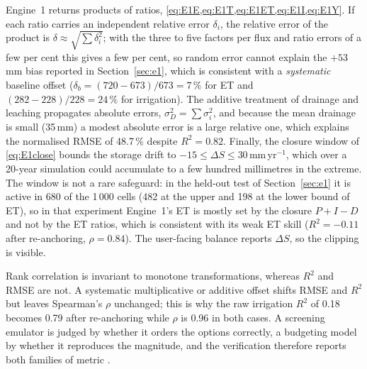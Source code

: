 Engine~1 returns products of ratios, \cref{eq:E1E,eq:E1T,eq:E1ET,eq:E1I,eq:E1Y}. If each ratio carries an independent relative error $\delta_i$, the relative error of the product is $\delta\approx\sqrt{\sum\delta_i^2}$; with the three to five factors per flux and ratio errors of a few per cent this gives a few per cent, so random error cannot explain the $+53$\,mm bias reported in Section~\ref{sec:e1}, which is consistent with a \emph{systematic} baseline offset ($\delta_b=(720-673)/673=7\,\%$ for ET and $(282-228)/228=24\,\%$ for irrigation). The additive treatment of drainage and leaching propagates absolute errors, $\sigma_D^2=\sum\sigma_i^2$, and because the mean drainage is small (35\,mm) a modest absolute error is a large relative one, which explains the normalised RMSE of 48.7\,\% despite $R^2=0.82$. Finally, the closure window of \cref{eq:E1close} bounds the storage drift to $-15\le\Delta S\le30$\,mm\,yr$^{-1}$, which over a 20-year simulation could accumulate to a few hundred millimetres in the extreme. The window is not a rare safeguard: in the held-out test of Section~\ref{sec:e1} it is active in 680 of the 1\,000 cells (482 at the upper and 198 at the lower bound of ET), so in that experiment Engine~1's ET is mostly set by the closure $P+I-D$ and not by the ET ratios, which is consistent with its weak ET skill ($R^2=-0.11$ after re-anchoring, $\rho=0.84$). The user-facing balance reports $\Delta S$, so the clipping is visible.

Rank correlation is invariant to monotone transformations, whereas $R^2$ and RMSE are not. A systematic multiplicative or additive offset shifts RMSE and $R^2$ but leaves Spearman's $\rho$ unchanged; this is why the raw irrigation $R^2$ of 0.18 becomes 0.79 after re-anchoring while $\rho$ is 0.96 in both cases. A screening emulator is judged by whether it orders the options correctly, a budgeting model by whether it reproduces the magnitude, and the verification therefore reports both families of metric \citep{Moriasi2007,Bennett2013}.



